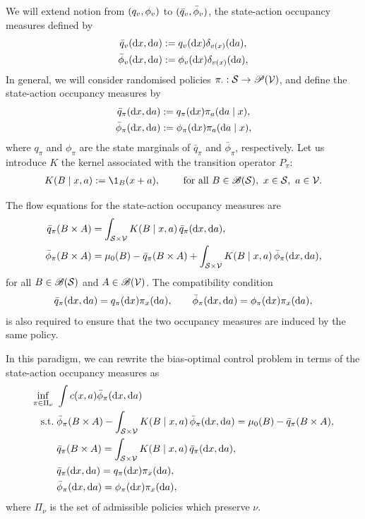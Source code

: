 \documentclass[twoside,10pt]{../jmlr}
\begin{document}
We will extend notion from $(q_v,\phi_v)$ to $(\bar q_v,\bar\phi_v)$, the state-action occupancy measures defined by
\begin{align}
    \bar q_v(\mathrm{d} x,\mathrm{d} a)&:=q_v(\mathrm{d} x)\delta_{v(x)}(\mathrm{d} a),\\
    \bar\phi_v(\mathrm{d} x,\mathrm{d} a)&:=\phi_v(\mathrm{d} x)\delta_{v(x)}(\mathrm{d} a),
\end{align}
In general, we will consider randomised policies $\pi_\cdot:\mathcal{S}\to\mathscr{P}(\mathcal{V})$, and define the state-action occupancy measures by
\begin{align}
    \bar q_\pi(\mathrm{d} x,\mathrm{d} a)&:=q_\pi(\mathrm{d} x)\pi_a(\mathrm{d} a\mid x),\\
    \bar\phi_\pi(\mathrm{d} x,\mathrm{d} a)&:=\phi_\pi(\mathrm{d} x)\pi_a(\mathrm{d} a\mid x),
\end{align}
where $q_\pi$ and $\phi_\pi$ are the state marginals of $\bar q_\pi$ and $\bar\phi_\pi$, respectively. Let us introduce $K$ the kernel associated with the transition operator $P_\pi$:
\begin{align}
    K(B\mid x,a):=\1_B(x+a),\qquad\mbox{ for all } B\in\Bs(\statespace),\ x\in\statespace,\ a\in\velocityspace.
\end{align}

The flow equations for the state-action occupancy measures are
\begin{align}
    \bar q_\pi(B\times A)&=\int_{\mathcal{S}\times\mathcal{V}}K(B\mid x,a)\,\bar q_\pi(\mathrm{d} x,\mathrm{d} a),\\
    \bar\phi_\pi(B\times A)&=\mu_0(B)-\bar q_\pi(B\times A)+\int_{\mathcal{S}\times\mathcal{V}}K(B\mid x,a)\,\bar\phi_\pi(\mathrm{d} x,\mathrm{d} a),
\end{align}
for all $B\in\mathscr{B}(\mathcal{S})$ and $A\in\mathscr{B}(\mathcal{V})$. The compatibility condition 
\begin{align}
    \bar q_\pi(\mathrm{d} x,\mathrm{d} a)=q_\pi(\mathrm{d} x)\pi_x(\mathrm{d} a),
    \qquad
    \bar\phi_\pi(\mathrm{d} x,\mathrm{d} a)=\phi_\pi(\mathrm{d} x)\pi_x(\mathrm{d} a),
\end{align}
is also required to ensure that the two occupancy measures are induced by the same policy.

In this paradigm, we can rewrite the bias-optimal control problem in terms of the state-action occupancy measures as
\begin{align}
    \inf_{\pi\in\Pi_\nu}\ & \int c(x,a)\bar\phi_\pi(\mathrm{d} x,\mathrm{d} a) \label{eq: introduction of state-action occupancy measure problem}\\
    \mbox{s.t.}\;& \bar\phi_\pi(B\times A)-\int_{\mathcal{S}\times\mathcal{V}}K(B\mid x,a)\,\bar\phi_\pi(\mathrm{d} x,\mathrm{d} a)=\mu_0(B)-\bar q_\pi(B\times A),\notag\\
    &\bar q_\pi(B\times A)=\int_{\mathcal{S}\times\mathcal{V}}K(B\mid x,a)\,\bar q_\pi(\mathrm{d} x,\mathrm{d} a),\notag\\
    &\bar q_\pi(\mathrm{d} x,\mathrm{d} a)=q_\pi(\mathrm{d} x)\pi_x(\mathrm{d} a),\notag\\   
    &\bar\phi_\pi(\mathrm{d} x,\mathrm{d} a)=\phi_\pi(\mathrm{d} x)\pi_x(\mathrm{d} a),\notag
\end{align}
where $\Pi_\nu$ is the set of admissible policies which preserve $\nu$.
\end{document}
